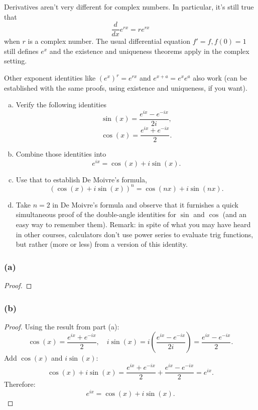\documentclass{article}
\begin{document}
\begin{problem}
    Derivatives aren't very different for complex numbers. In particular, it's still true that
    \[\frac{d}{dx} e^{rx} = re^{rx}\]
    when \(r\) is a complex number. The usual differential equation \(f'=f, f(0)=1\) still defines \(e^x\) and the existence and uniqueness theorems apply in the complex setting. 
    
    \hspace{2em}Other exponent identities like \((e^x)^r = e^{rx}\) and \(e^{x+a} = e^xe^a\) also work (can be established with the same proofs, using existence and uniqueness, if you want).
    \begin{enumerate}[a)]
        \item Verify the following identities
            \[\sin(x) = \frac{e^{ix} - e^{-ix}}{2i},\]
            \[\cos(x) = \frac{e^{ix} + e^{-ix}}{2}.\]
        \item Combine those identities into
            \[e^{ix} = \cos(x) + i\sin(x).\]
        \item Use that to establish De Moivre's formula,
            \[(\cos(x) + i\sin(x))^n = \cos(nx) + i\sin(nx).\]
        \item Take \(n=2\) in De Moivre's formula and observe that it furnishes a quick simultaneous proof of the double-angle identities for \(\sin\) and \(\cos\)  (and an easy way to remember them). Remark: in spite of what you may have heard in other courses, calculators don't use power series to evaluate trig functions, but rather (more or less) from a version of this identity.
    \end{enumerate}
\end{problem}

\subsubsection*{(a)}
\begin{proof}
   
\end{proof}

\subsubsection*{(b)}
\begin{proof}
    Using the result from part (a):
    \[
        \cos(x) = \frac{e^{ix} + e^{-ix}}{2}, \quad 
        i \sin(x) = i \left( \frac{e^{ix} - e^{-ix}}{2i} \right) = \frac{e^{ix} - e^{-ix}}{2}.
    \]
    Add \( \cos(x) \) and \( i \sin(x) \):
    \[
        \cos(x) + i \sin(x) = \frac{e^{ix} + e^{-ix}}{2} + \frac{e^{ix} - e^{-ix}}{2} = e^{ix}.
    \]
    Therefore:
    \[
        e^{ix} = \cos(x) + i \sin(x).
    \]
\end{proof}
\end{document}
